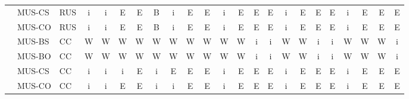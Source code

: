 \begin{table}[!htbp]
\begin{tabular}{lllcccccccccccccccccccc}
 & MUS-CS & RUS & i & i & E & E & B & i & E & E & i & E & E & E & i & E & E & E & i & E & E & E \\
 & MUS-CO & RUS & i & i & E & E & B & i & E & E & i & E & E & E & i & E & E & E & i & E & E & E \\
 & MUS-BS & CC & W & W & W & W & W & W & W & W & W & W & i & i & W & W & i & i & W & W & W & i \\
 & MUS-BO & CC & W & W & W & W & W & W & W & W & W & W & i & i & W & W & i & i & W & W & W & i \\
 & MUS-CS & CC & i & i & i & E & i & E & E & E & i & E & E & E & i & E & E & E & i & E & E & E \\
 & MUS-CO & CC & i & i & E & E & i & i & E & E & i & E & E & E & i & E & E & E & i & E & E & E \\
\bottomrule
\end{tabular}
\end{table}
